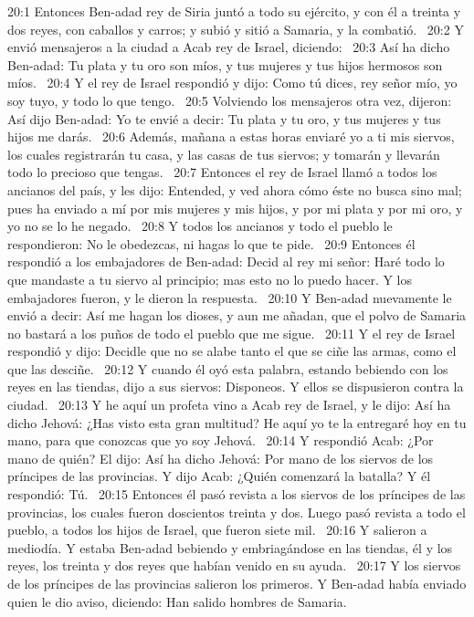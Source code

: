 20:1 Entonces Ben-adad rey de Siria juntó a todo su ejército, y con él a treinta y dos reyes, con caballos y carros; y subió y sitió a Samaria, y la combatió.  
20:2 Y envió mensajeros a la ciudad a Acab rey de Israel, diciendo:  
20:3 Así ha dicho Ben-adad: Tu plata y tu oro son míos, y tus mujeres y tus hijos hermosos son míos.  
20:4 Y el rey de Israel respondió y dijo: Como tú dices, rey señor mío, yo soy tuyo, y todo lo que tengo.  
20:5 Volviendo los mensajeros otra vez, dijeron: Así dijo Ben-adad: Yo te envié a decir: Tu plata y tu oro, y tus mujeres y tus hijos me darás.  
20:6 Además, mañana a estas horas enviaré yo a ti mis siervos, los cuales registrarán tu casa, y las casas de tus siervos; y tomarán y llevarán todo lo precioso que tengas.  
20:7 Entonces el rey de Israel llamó a todos los ancianos del país, y les dijo: Entended, y ved ahora cómo éste no busca sino mal; pues ha enviado a mí por mis mujeres y mis hijos, y por mi plata y por mi oro, y yo no se lo he negado.  
20:8 Y todos los ancianos y todo el pueblo le respondieron: No le obedezcas, ni hagas lo que te pide.  
20:9 Entonces él respondió a los embajadores de Ben-adad: Decid al rey mi señor: Haré todo lo que mandaste a tu siervo al principio; mas esto no lo puedo hacer. Y los embajadores fueron, y le dieron la respuesta.  
20:10 Y Ben-adad nuevamente le envió a decir: Así me hagan los dioses, y aun me añadan, que el polvo de Samaria no bastará a los puños de todo el pueblo que me sigue.  
20:11 Y el rey de Israel respondió y dijo: Decidle que no se alabe tanto el que se ciñe las armas, como el que las desciñe.  
20:12 Y cuando él oyó esta palabra, estando bebiendo con los reyes en las tiendas, dijo a sus siervos: Disponeos. Y ellos se dispusieron contra la ciudad.  
20:13 Y he aquí un profeta vino a Acab rey de Israel, y le dijo: Así ha dicho Jehová: ¿Has visto esta gran multitud? He aquí yo te la entregaré hoy en tu mano, para que conozcas que yo soy Jehová.  
20:14 Y respondió Acab: ¿Por mano de quién? El dijo: Así ha dicho Jehová: Por mano de los siervos de los príncipes de las provincias. Y dijo Acab: ¿Quién comenzará la batalla? Y él respondió: Tú.  
20:15 Entonces él pasó revista a los siervos de los príncipes de las provincias, los cuales fueron doscientos treinta y dos. Luego pasó revista a todo el pueblo, a todos los hijos de Israel, que fueron siete mil.  
20:16 Y salieron a mediodía. Y estaba Ben-adad bebiendo y embriagándose en las tiendas, él y los reyes, los treinta y dos reyes que habían venido en su ayuda.  
20:17 Y los siervos de los príncipes de las provincias salieron los primeros. Y Ben-adad había enviado quien le dio aviso, diciendo: Han salido hombres de Samaria.  
